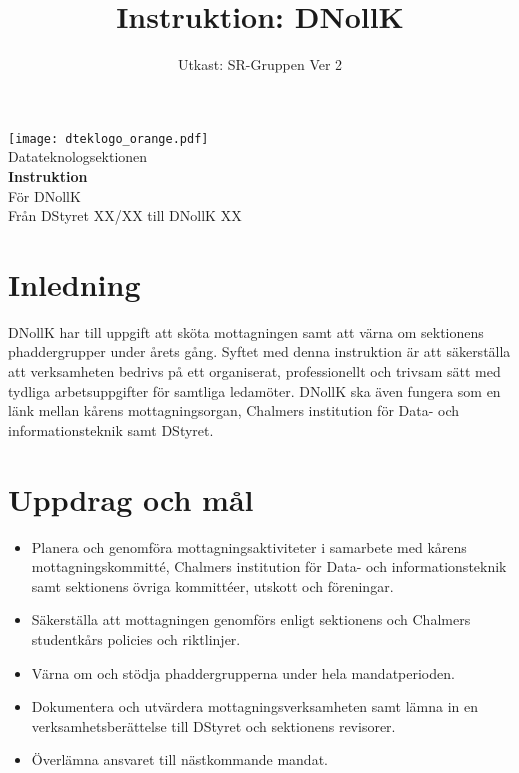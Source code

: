 \documentclass[a4paper]{dtekinstruktion}
\title{Instruktion: DNollK}
\date{Utkast: SR-Gruppen Ver 2}
\begin{document}
\begin{titlepage}
  \thispagestyle{empty} %
  \vspace*{1cm}
  \begin{center}
    \texttt{[image: dteklogo\_orange.pdf]}\\[3em]
    {\Huge Datateknologsektionen}\\[3em]
    {\Huge \textbf{Instruktion}}\\[1em]
    {\Huge För DNollK}\\[3em]
    Från DStyret XX/XX till DNollK XX
  \end{center}
\end{titlepage}

\makeheadfoot

\tableofcontents

\section{Inledning}
DNollK har till uppgift att sköta mottagningen samt att värna om sektionens phaddergrupper under årets gång. Syftet med denna instruktion är att säkerställa att verksamheten bedrivs på ett organiserat, professionellt och trivsam sätt med tydliga arbetsuppgifter för samtliga ledamöter. DNollK ska även fungera som en länk mellan kårens mottagningsorgan, Chalmers institution för Data- och informationsteknik samt DStyret.

\section{Uppdrag och mål}
\begin{itemize}
  \item Planera och genomföra mottagningsaktiviteter i samarbete med kårens mottagningskommitté, Chalmers institution för Data- och informationsteknik samt sektionens övriga kommittéer, utskott och föreningar.
  \item Säkerställa att mottagningen genomförs enligt sektionens och Chalmers studentkårs policies och riktlinjer.
  \item Värna om och stödja phaddergrupperna under hela mandatperioden.
  \item Dokumentera och utvärdera mottagningsverksamheten samt lämna in en verksamhetsberättelse till DStyret och sektionens revisorer.
  \item Överlämna ansvaret till nästkommande mandat.
\end{itemize}
\end{document}
